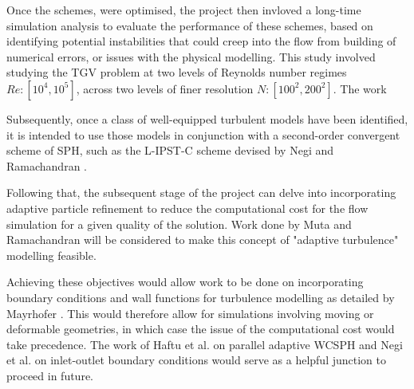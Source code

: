 Once the schemes, were optimised, the project then invloved a long-time simulation analysis to evaluate the performance of these schemes, based on identifying potential instabilities that could creep into the flow from building of numerical errors, or issues with the physical modelling. This study involved studying the TGV problem at two levels of Reynolds number regimes $Re: [10^4, 10^5]$, across two levels of finer resolution $N: [100^2, 200^2]$.
The work 


Subsequently, once a class of well-equipped turbulent models have been identified, it is intended to use those models in conjunction with a second-order convergent scheme of SPH, such as the L-IPST-C scheme devised by Negi and Ramachandran \parencite{Negi2022Techniques}. 

Following that, the subsequent stage of the project can delve into incorporating adaptive particle refinement to reduce the computational cost for the flow simulation for a given quality of the solution. Work done by Muta and Ramachandran \parencite{Muta2022} will be considered to make this concept of "adaptive turbulence" modelling feasible.

Achieving these objectives would allow work to be done on incorporating boundary conditions and wall functions for turbulence modelling as detailed by Mayrhofer \parencite{Mayrhofer2014}. 
This would therefore allow for simulations involving moving or deformable geometries, in which case the issue of the computational cost would take precedence. The work of Haftu et al. \parencite{Haftu2022} on parallel adaptive WCSPH and Negi et al. \parencite{negi2020improved} on inlet-outlet boundary conditions would serve as a helpful junction to proceed in future.
